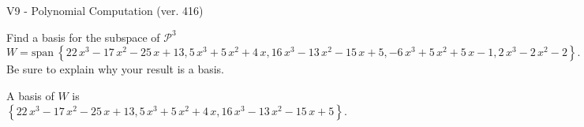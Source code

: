 \begin{exercise}
  \begin{exerciseTitle}V9 - Polynomial Computation (ver. 416)\end{exerciseTitle}
  \begin{exerciseStatement}
    Find a basis for the subspace of \(\mathcal{P}^3\) 
\[W=\mathrm{span}\ \left\{22 \, x^{3} - 17 \, x^{2} - 25 \, x + 13 , 5 \, x^{3} + 5 \, x^{2} + 4 \, x , 16 \, x^{3} - 13 \, x^{2} - 15 \, x + 5 , -6 \, x^{3} + 5 \, x^{2} + 5 \, x - 1 , 2 \, x^{3} - 2 \, x^{2} - 2\right\}.\]
 Be sure to explain why your result is a basis.


  \end{exerciseStatement}
  \begin{exerciseAnswer}
   A basis of \(W\) is  \(\left\{22 \, x^{3} - 17 \, x^{2} - 25 \, x + 13 , 5 \, x^{3} + 5 \, x^{2} + 4 \, x , 16 \, x^{3} - 13 \, x^{2} - 15 \, x + 5\right\}\).
  


  \end{exerciseAnswer}
\end{exercise}